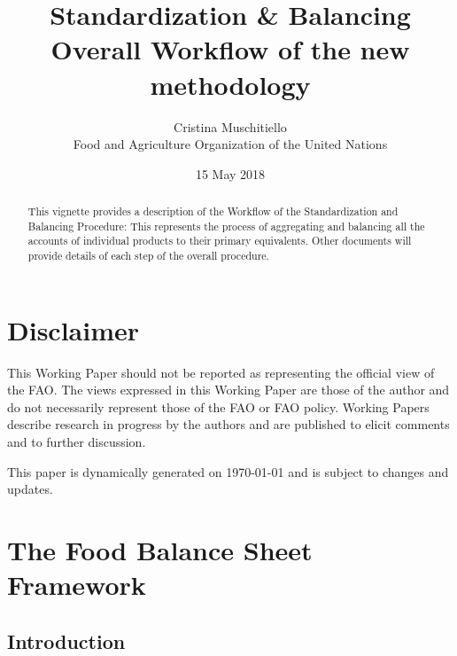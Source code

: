 \documentclass[]{article}
\title{Standardization \& Balancing\\
Overall Workflow of the new methodology}
\author{Cristina Muschitiello\\
Food and Agriculture Organization of the United Nations}
\date{15 May 2018}
\begin{document}
\maketitle
\begin{abstract}
This vignette provides a description of the Workflow of the
Standardization and Balancing Procedure: This represents the process of
aggregating and balancing all the accounts of individual products to
their primary equivalents. Other documents will provide details of each
step of the overall procedure.
\end{abstract}

{
\setcounter{tocdepth}{4}
\tableofcontents
}
\section*{Disclaimer}\label{disclaimer}

This Working Paper should not be reported as representing the official
view of the FAO. The views expressed in this Working Paper are those of
the author and do not necessarily represent those of the FAO or FAO
policy. Working Papers describe research in progress by the authors and
are published to elicit comments and to further discussion.

This paper is dynamically generated on \today{} and is subject to
changes and updates.

\newpage

\section{The Food Balance Sheet
Framework}\label{the-food-balance-sheet-framework}

\subsection{Introduction}\label{introduction}
\end{document}
